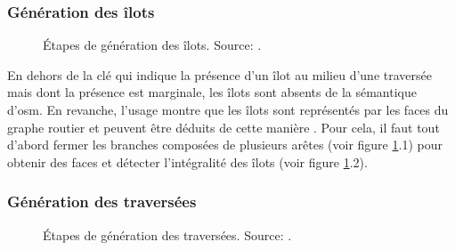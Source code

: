 \subsubsection{Génération des îlots}

\begin{figure}
    \centering
    \caption{Étapes de génération des îlots. Source: \cite{Kalsron2022}.}
    \label{fig:modelisation_calcul_pieton_ilots}
\end{figure}

En dehors de la clé  qui indique la présence d'un îlot au milieu d'une traversée mais dont la présence est marginale, les îlots sont absents de la sémantique d'\gls{osm}. En revanche, l'usage montre que les îlots sont représentés par les faces du graphe routier et peuvent être déduits de cette manière \cite{Vitalis2022}. Pour cela, il faut tout d'abord fermer les branches composées de plusieurs arêtes (voir figure \ref{fig:modelisation_calcul_pieton_ilots}.1) pour obtenir des faces et détecter l'intégralité des îlots (voir figure \ref{fig:modelisation_calcul_pieton_ilots}.2).

\subsubsection{Génération des traversées}

\begin{figure}
    \centering
    \caption{Étapes de génération des traversées. Source: \cite{Kalsron2022}.}
    \label{fig:modelisation_calcul_pieton_traversees}
\end{figure}

